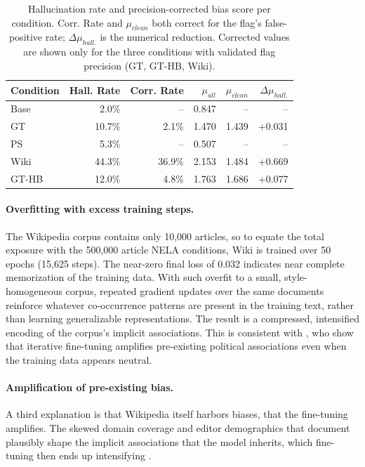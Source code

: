 \documentclass[11pt]{article}
\begin{document}
\begin{table}[htbp]
  \centering
  \small
  \setlength{\tabcolsep}{2.6pt}
  \begin{tabular}{lrrrrr}
    \toprule
    Condition & Hall. Rate & Corr. Rate & $\mu_{all}$ & $\mu_{clean}$ & $\Delta\mu_{hall.}$ \\
    \midrule
    Base      & 2.0\%      & --         & 0.847       & --            & --                  \\
    GT        & 10.7\%     & 2.1\%      & 1.470       & 1.439         & +0.031              \\
    PS        & 5.3\%      & --         & 0.507       & --            & --                  \\
    Wiki      & 44.3\%     & 36.9\%     & 2.153       & 1.484         & +0.669              \\
    GT-HB     & 12.0\%     & 4.8\%      & 1.763       & 1.686         & +0.077              \\
    \bottomrule
  \end{tabular}
  \caption{Hallucination rate and precision-corrected bias score per condition. Corr. Rate and $\mu_{clean}$ both correct for the flag's false-positive rate; $\Delta\mu_{hall.}$ is the numerical reduction. Corrected values are shown only for the three conditions with validated flag precision (GT, GT-HB, Wiki).}
  \label{tab:hallucination_summary}
\end{table}


\paragraph{Overfitting with excess training steps.}
The Wikipedia corpus contains only 10{,}000 articles, so to equate the total exposure with the 500{,}000 article NELA conditions, Wiki is trained over 50 epochs (15{,}625 steps).
The near-zero final loss of 0.032 indicates near complete memorization of the training data.
With such overfit to a small, style-homogeneous corpus, repeated gradient updates over the same documents reinforce whatever co-occurrence patterns are present in the training text, rather than learning generalizable representations.
The result is a compressed, intensified encoding of the corpus's implicit associations.
This is consistent with \citet{wang2024bias}, who show that iterative fine-tuning amplifies pre-existing political associations even when the training data appears neutral.

\paragraph{Amplification of pre-existing bias.}
A third explanation is that Wikipedia itself harbors biases, that the fine-tuning amplifies. 
The skewed domain coverage and editor demographics that \citet{navigli2023} document plausibly shape the implicit associations that the model inherits, which fine-tuning then ends up intensifying \cite{wang2024bias}.
\end{document}
